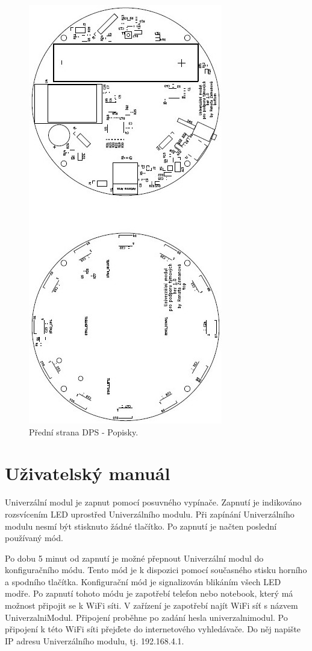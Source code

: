 \begin{figure}[!h]
	\begin{center}
	  \includegraphics[scale=1.1]{obrazky/Vyrobni_podkady_F_Silkscreen.jpg}
	\end{center}
	\caption[Přední strana DPS - Popisky]{Přední strana DPS - Popisky.}
\end{figure}


\chapter{Uživatelský manuál}
Univerzální modul je zapnut pomocí posuvného vypínače. Zapnutí je indikováno rozsvícením LED uprostřed Univerzálního modulu. Při zapínání Univerzálního modulu nesmí být stisknuto žádné tlačítko. Po zapnutí je načten 
poslední používaný mód. 

Po dobu 5 minut od zapnutí je možné přepnout Univerzální modul do konfiguračního módu. Tento mód je k dispozici pomocí současného stisku horního a spodního tlačítka. Konfigurační mód je signalizován blikáním všech 
LED modře. Po zapnutí tohoto módu je zapotřebí telefon 
nebo notebook, který má možnost připojit se k WiFi síti. V zařízení je zapotřebí najít WiFi síť s názvem UniverzalniModul. Připojení proběhne po zadání hesla univerzalnimodul. Po připojení k této WiFi síti přejďete 
do internetového vyhledávače. Do něj napište IP adresu Univerzálního modulu, tj. 192.168.4.1. 

